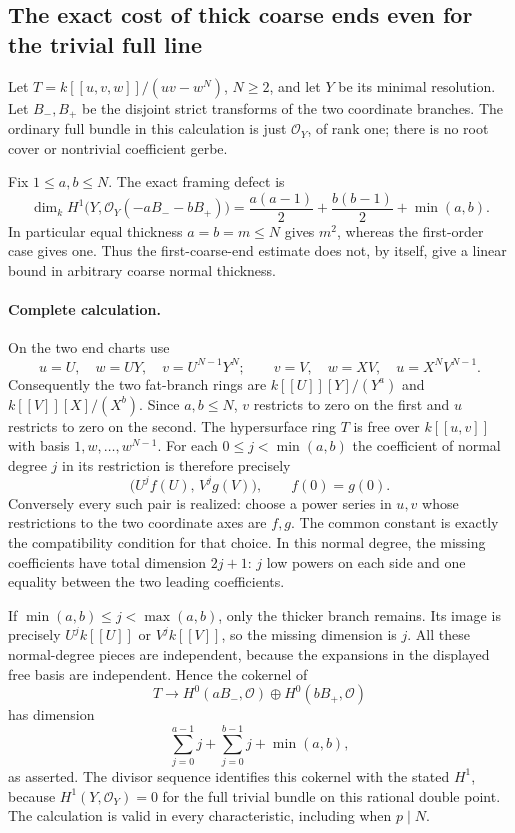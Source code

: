 \subsection*{The exact cost of thick coarse ends even for the trivial full line}

Let $T=k[[u,v,w]]/(uv-w^N)$, $N\ge2$, and let $Y$ be its
minimal resolution.  Let $B_-,B_+$ be the disjoint strict transforms
of the two coordinate branches.  The ordinary full bundle in this
calculation is just $\mathcal O_Y$, of rank one; there is no root
cover or nontrivial coefficient gerbe.

Fix $1\le a,b\le N$.  The exact framing defect is
\[
 \dim_k H^1\bigl(Y,\mathcal O_Y(-aB_--bB_+)\bigr)
       =\frac{a(a-1)}2+\frac{b(b-1)}2+\min(a,b).
\]
In particular equal thickness $a=b=m\le N$ gives $m^2$, whereas
the first-order case gives one.  Thus the first-coarse-end estimate
does not, by itself, give a linear bound in arbitrary coarse
normal thickness.

\paragraph{Complete calculation.}
On the two end charts use
\[
 u=U,\quad w=UY,\quad v=U^{N-1}Y^N;
 \qquad
 v=V,\quad w=XV,\quad u=X^NV^{N-1}.
\]
Consequently the two fat-branch rings are
$k[[U]][Y]/(Y^a)$ and $k[[V]][X]/(X^b)$.
Since $a,b\le N$, $v$ restricts to zero on the first and $u$
restricts to zero on the second.  The hypersurface ring $T$ is
free over $k[[u,v]]$ with basis $1,w,\ldots,w^{N-1}$.
For each $0\le j<\min(a,b)$ the coefficient of normal degree $j$
in its restriction is therefore precisely
\[
       \bigl(U^j f(U),\,V^j g(V)\bigr),
                  \qquad f(0)=g(0).
\]
Conversely every such pair is realized: choose a power series in
$u,v$ whose restrictions to the two coordinate axes are $f,g$.
The common constant is exactly the compatibility condition for
that choice.  In this normal degree, the missing coefficients
have total dimension $2j+1$: $j$ low powers on each side and
one equality between the two leading coefficients.

If $\min(a,b)\le j<\max(a,b)$, only the thicker branch remains.
Its image is precisely $U^j k[[U]]$ or $V^j k[[V]]$, so the
missing dimension is $j$.  All these normal-degree pieces are
independent, because the expansions in the displayed free basis
are independent.  Hence the cokernel of
\[
 T\longrightarrow H^0(aB_-,\mathcal O)\oplus
                         H^0(bB_+,\mathcal O)
\]
has dimension
\[
 \sum_{j=0}^{a-1}j+\sum_{j=0}^{b-1}j+\min(a,b),
\]
as asserted.  The divisor sequence identifies this cokernel with
the stated $H^1$, because $H^1(Y,\mathcal O_Y)=0$ for the full
trivial bundle on this rational double point.  The calculation
is valid in every characteristic, including when $p\mid N$.

